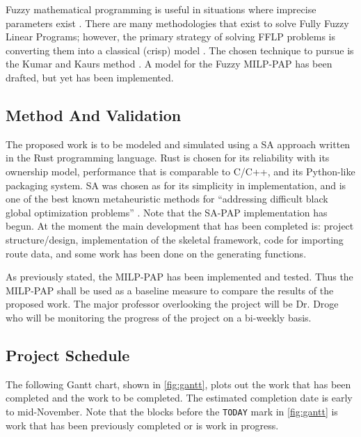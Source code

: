 \documentclass[11pt,a4paper,final]{article}
\begin{document}
Fuzzy mathematical programming is useful in situations where imprecise parameters exist \cite{bello-2019-fuzzy-activ}.
There are many methodologies that exist to solve Fully Fuzzy Linear Programs; however, the primary strategy of solving
FFLP problems is converting them into a classical (crisp) model
\cite{bello-2019-fuzzy-activ,nasseri-2013-fully,kaur-2016-introd-fuzzy}. The chosen technique to pursue is the Kumar
and Kaurs method \cite{kaur-2016-introd-fuzzy}. A model for the Fuzzy MILP-PAP has been drafted, but yet has been
implemented.

\subsection{Method And Validation}
\label{sec:orgf45ecde}
The proposed work is to be modeled and simulated using a SA approach written in the Rust programming language. Rust is
chosen for its reliability with its ownership model, performance that is comparable to C/C++, and its Python-like
packaging system. SA was chosen as for its simplicity in implementation, and is one of the best known metaheuristic
methods for ``addressing difficult black global optimization problems'' \cite{delahaye-2019-simul}. Note that the SA-PAP
implementation has begun. At the moment the main development that has been completed is: project structure/design,
implementation of the skeletal framework, code for importing route data, and some work has been done on the generating
functions.

As previously stated, the MILP-PAP has been implemented and tested. Thus the MILP-PAP shall be used as a baseline
measure to compare the results of the proposed work. The major professor overlooking the project will be Dr. Droge who
will be monitoring the progress of the project on a bi-weekly basis.

\subsection{Project Schedule}
\label{sec:org6e0048e}
The following Gantt chart, shown in \autoref{fig:gantt}, plots out the work that has been completed and the work to be completed.
The estimated completion date is early to mid-November. Note that the blocks before the \texttt{TODAY} mark in
\autoref{fig:gantt} is work that has been previously completed or is work in progress.
\end{document}
